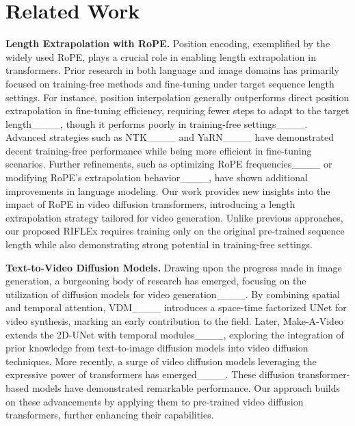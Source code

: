 \section{Related Work}

\textbf{Length Extrapolation  with RoPE.}
Position encoding, exemplified by the widely used RoPE, plays a crucial role in enabling length extrapolation in transformers. Prior research in both language and image domains has primarily focused on training-free methods and fine-tuning under target sequence length settings. For instance, position interpolation generally outperforms direct position extrapolation in fine-tuning efficiency, requiring fewer steps to adapt to the target length____, though it performs poorly in training-free settings____. Advanced strategies such as NTK____ and YaRN____ have demonstrated decent training-free performance while being more efficient in fine-tuning scenarios.
Further refinements, such as optimizing RoPE frequencies____ or modifying RoPE's extrapolation behavior____, have shown additional improvements in language modeling. 
Our work provides new insights into the impact of RoPE in video diffusion transformers, introducing a length extrapolation strategy tailored for video generation. Unlike previous approaches, our proposed RIFLEx requires training only on the original pre-trained sequence length while also demonstrating strong potential in training-free settings.

\textbf{Text-to-Video Diffusion Models.} 
Drawing upon the progress made in image generation, a burgeoning body of research has emerged, focusing on the utilization of diffusion models for video generation____. By combining spatial and temporal attention, VDM____ introduces a space-time factorized UNet for video synthesis, marking an early contribution to the field. Later, Make-A-Video extends the 2D-UNet with temporal modules____, exploring the integration of prior knowledge from text-to-image diffusion models into video diffusion techniques. More recently, a surge of video diffusion models leveraging the expressive power of transformers has emerged____. These diffusion transformer-based models have demonstrated remarkable performance. Our approach builds on these advancements by applying them to pre-trained video diffusion transformers, further enhancing their capabilities.

